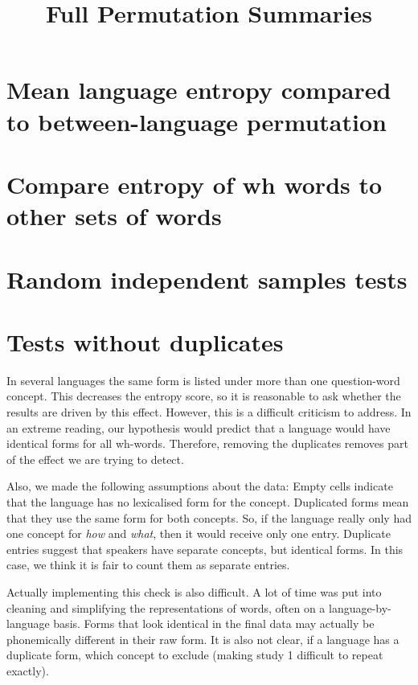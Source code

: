 \documentclass[10pt,a4paper,landscape]{article}
\title{Full Permutation Summaries}
\author{}
\date{} %
\begin{document}
\maketitle

\section{Mean language entropy compared to between-language permutation}


\clearpage
\newpage
\section{Compare entropy of wh words to other sets of words}



\clearpage
\newpage

\section{Random independent samples tests}





\clearpage
\newpage
\section{Tests without duplicates}

In several languages the same form is listed under more than one question-word concept.  This decreases the entropy score, so it is reasonable to ask whether the results are driven by this effect.  However, this is a difficult criticism to address.  In an extreme reading, our hypothesis would predict that a language would have identical forms for all wh-words.  Therefore, removing the duplicates removes part of the effect we are trying to detect.  

Also, we made the following assumptions about the data: Empty cells indicate that the language has no lexicalised form for the concept.  Duplicated forms mean that they use the same form for both concepts.  So, if the language really only had one concept for \emph{how} and \emph{what}, then it would receive only one entry.  Duplicate entries suggest that speakers have separate concepts, but identical forms.  In this case, we think it is fair to count them as separate entries.

Actually implementing this check is also difficult.  A lot of time was put into cleaning and simplifying the representations of words, often on a language-by-language basis.  Forms that look identical in the final data may actually be phonemically different in their raw form.  It is also not clear, if a language has a duplicate form, which concept to exclude (making study 1 difficult to repeat exactly).
\end{document}
